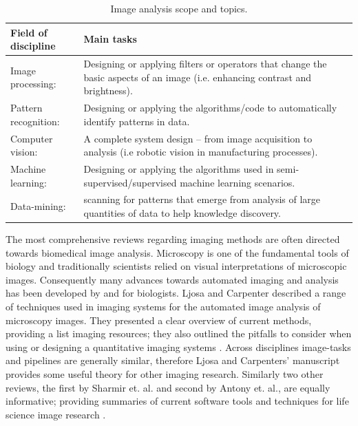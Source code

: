 \begin{table}[!htbp]\myfloatalign \caption[Image analysis scope and topics.]{Image analysis scope and topics.}\label{tab:Imagea_scope} 
\begin{tabular}{p{1.4in}p{3.0in}}\toprule
Field of discipline & Main tasks \\ \midrule
Image processing:& Designing or applying filters or operators that change the basic aspects of an image (i.e. enhancing contrast and brightness). \\
Pattern recognition:&  Designing or applying the algorithms/code to automatically identify patterns in data.\\
Computer vision:& A complete system design -- from image acquisition to analysis (i.e robotic vision in manufacturing processes). \\
Machine learning:& Designing or applying the algorithms used in  semi-supervised/supervised machine learning scenarios.\\
Data-mining:& scanning for patterns that emerge from analysis of large quantities of data to help knowledge discovery.\\ \bottomrule 
\end{tabular}
\end{table}

The most comprehensive reviews regarding imaging methods are often directed towards biomedical image analysis. Microscopy is one of the fundamental tools of biology and traditionally scientists relied on visual interpretations of microscopic images. Consequently many advances towards automated imaging and analysis has been developed by and for biologists. Ljosa and Carpenter \cite{Ljosa2009} described a range of techniques used in imaging systems for the automated image analysis of microscopy images.  They presented a clear overview of current methods, providing a list imaging resources; they also outlined the pitfalls to consider when using or designing a quantitative imaging systems \cite{Ljosa2009}. Across disciplines image-tasks and pipelines are generally similar, therefore Ljosa and Carpenters' \cite{Ljosa2009}  manuscript provides some useful theory for other imaging research. Similarly two other  reviews, the first by Sharmir et. al. and second by Antony et. al.,  are equally informative; providing summaries of current software tools and techniques for life science image research \cite{Shamir2010,Antony2013}.

